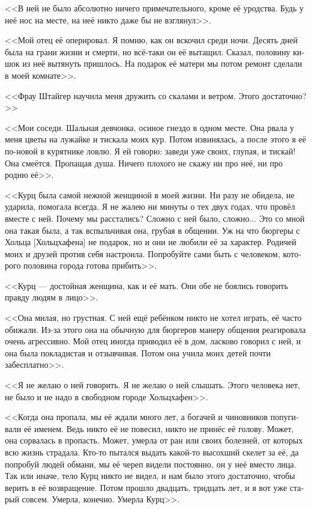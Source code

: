 \documentclass[a4paper,12pt,fleqn]{book}\usepackage{cooltooltips}\usepackage{polyglossia}\setdefaultlanguage[babelshorthands=true]{russian}\setotherlanguage{english}\defaultfontfeatures{Ligatures=TeX,Mapping=tex-text} \usepackage{xcolor}\definecolor{lightgray}{HTML}{bbbbbb}\color{lightgray}\newcommand{\ml}[3]{\textenglish{\textcolor{black}{#3}}}
\begin{document}
<<В ней не было абсолютно ничего примечательного, кроме её уродства.
Будь у неё нос на месте, на неё никто даже бы не взглянул>>.

<<Мой отец её оперировал.
Я помню, как он вскочил среди ночи.
Десять дней была на грани жизни и смерти, но всё-таки он её вытащил.
Сказал, половину кишок из неё вытянуть пришлось.
На подарок её матери мы потом ремонт сделали в моей комнате>>.

<<Фрау Штайгер научила меня дружить со скалами и ветром.
Этого достаточно?>>

<<Мои соседи.
Шальная девчонка, осиное гнездо в одном месте.
Она рвала у меня цветы на лужайке и тискала моих кур.
Потом извинялась, а после этого я её по-новой в курятнике ловлю.
Я ей говорю: заведи уже своих, глупая, и тискай!
Она смеётся.
Пропащая душа.
Ничего плохого не скажу ни про неё, ни про родню её>>.

<<Курц была самой нежной женщиной в моей жизни.
Ни разу не обидела, не ударила, помогала всегда.
Я не жалею ни минуты о тех двух годах, что провёл вместе с ней.
Почему мы расстались?
Сложно с ней было, сложно...
Это со мной она такая была, а так вспыльчивая она, грубая в общении.
Уж на что бюргеры с Хольца [Хольцхафена] не подарок, но и они не любили её за характер.
Родичей моих и друзей против себя настроила.
Попробуйте сами быть с человеком, которого половина города готова прибить>>.

<<Курц --- достойная женщина, как и её мать.
Они обе не боялись говорить правду людям в лицо>>.

<<Она милая, но грустная.
С ней ещё ребёнком никто не хотел играть, её часто обижали.
Из-за этого она на обычную для бюргеров манеру общения реагировала очень агрессивно.
Мой отец иногда приводил её в дом, ласково говорил с ней, и она была покладистая и отзывчивая.
Потом она учила моих детей почти забесплатно>>.

<<Я не желаю о ней говорить.
Я не желаю о ней слышать.
Этого человека нет, не было и не надо в свободном городе Хольцхафен>>.

<<Когда она пропала, мы её ждали много лет, а богачей и чиновников попугивали её именем.
Ведь никто её не повесил, никто не принёс её голову.
Может, она сорвалась в пропасть.
Может, умерла от ран или своих болезней, от которых всю жизнь страдала.
Кто-то пытался выдать какой-то высохший скелет за её, да попробуй людей обмани, мы её череп видели постоянно, он у неё вместо лица.
Так или иначе, тело Курц никто не видел, и нам было этого достаточно, чтобы верить в её возвращение.
Потом прошло двадцать, тридцать лет, и я вот уже старый совсем.
Умерла, конечно.
Умерла Курц>>.
\end{document}
